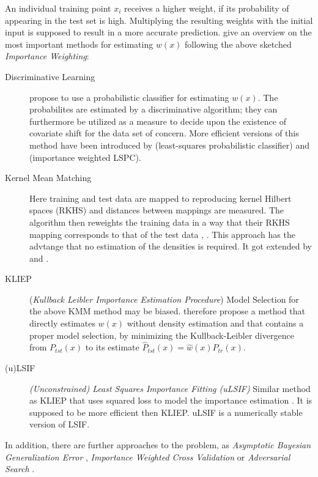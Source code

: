 An individual training point $x_i$ receives a higher weight, if its probability of appearing in the test set is high. Multiplying the resulting weights with the initial input is supposed to result in a more accurate prediction.  \citep{nair2019covariate} give an overview on the most important methods for estimating $w(x)$ following the above sketched \textit{Importance Weighting}:

\begin{description}
	\item[Discriminative Learning] \citep{bickel2009discriminative} propose to use a probabilistic classifier for estimating $w(x)$. The probabilites are estimated by a discriminative algorithm; they can furthermore be utilized as a measure to decide upon the existence of covariate shift for the data set of concern. More efficient versions of this method have been introduced by \citep{sugiyama2010superfast} (least-squares probabilistic classifier) and \citep{yamada2011improving} (importance weighted LSPC).
	
	\item[Kernel Mean Matching] Here training and test data are mapped to reproducing kernel Hilbert spaces (RKHS) and distances between mappings are measured. The algorithm then reweights the training data in a way that their RKHS mapping corresponds to that of the test data \citep{gretton2009covariate}, \citep{huang2006correcting}. This approach has the advtange that no estimation of the densities is required. It got extended by \citep{kanamori2009condition} and \citep{miao2015ensemble}. 
	
	\item[KLIEP] (\textit{Kullback Leibler Importance Estimation Procedure}) Model Selection for the above KMM method may be biased. \citep{sugiyama2008direct} therefore propose a method that directly estimates $w(x)$ without density estimation and that contains a proper model selection, by minimizing the Kullback-Leibler divergence from $P_{tst}(x)$ to its estimate $\hat{P}_{tst}(x) = \hat{w}(x)P_{tr}(x)$.
	
	\item[(u)LSIF] \textit{(Unconstrained) Least Squares Importance Fitting (uLSIF)} Similar method as KLIEP that uses squared loss to model the importance estimation \citep{kanamori2009least}. It is supposed to be more efficient then KLIEP. uLSIF is a numerically stable version of LSIF.
\end{description}

In addition, there are further approaches to the problem, as \textit{Asymptotic Bayesian Generalization Error} \citep{yamazaki2007asymptotic}, \textit{Importance Weighted Cross Validation} \citep{sugiyama2007covariate} or \textit{Adversarial Search} \citep{globerson2009adversarial}.

